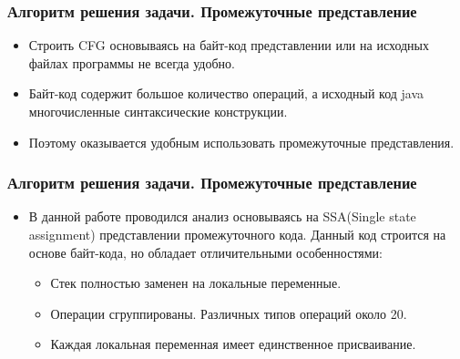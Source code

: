 \documentclass[t]{beamer}  %
\begin{document}
\begin{frame}[fragile]
  \frametitle{Алгоритм решения задачи. Промежуточные представление}
  \vspace{0.5cm}  
\begin{itemize}
    \setlength\itemsep{1cm}
    \item Строить CFG основываясь на байт-код представлении или на исходных файлах программы не всегда удобно.
    \item Байт-код содержит большое количество операций, а исходный код java многочисленные синтаксические конструкции.
    \item Поэтому оказывается удобным использовать промежуточные представления. 
  \end{itemize}
\end{frame}

\begin{frame}[fragile]
  \frametitle{Алгоритм решения задачи. Промежуточные представление}
  \begin{itemize}
    \item В данной работе проводился анализ основываясь на SSA(Single state assignment) представлении промежуточного кода.  Данный код строится на основе байт-кода, но обладает отличительными особенностями:
	 \begin{itemize}
	    \setlength\itemsep{0.5cm}
            \item Стек полностью заменен на локальные переменные.
	    \item Операции сгруппированы. Различных типов операций около 20.
	    \item Каждая локальная переменная имеет единственное присваивание.
	 \end{itemize} 
  \end{itemize}
\end{frame}
\end{document}
